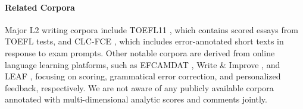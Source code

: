 \paragraph{Related Corpora} Major L2 writing corpora include TOEFL11 \citep{TOEFL11}, which contains scored essays from TOEFL tests, and CLC-FCE \citep{yannakoudakis-etal-2011-new}, which includes error-annotated short texts in response to exam prompts. Other notable corpora are derived from online language learning platforms, such as EFCAMDAT \citep{vanRooy_2015}, Write \& Improve \citep{Helen2018}, and LEAF \citep{behzad-etal-2024-leaf}, focusing on scoring, grammatical error correction, and personalized feedback, respectively. We are not aware of any publicly available corpora annotated with multi-dimensional analytic scores and comments jointly.

